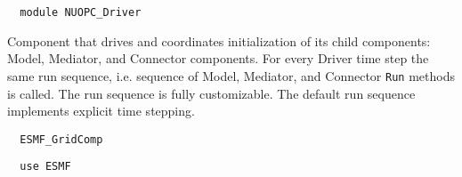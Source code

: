  
\setlength{\parskip}{0pt}
\setlength{\parindent}{0pt}
\setlength{\baselineskip}{11pt}
 
\def\bv{\begin{verbatim}}
\def\ev{\end{verbatim}}
\def\be{\begin{equation}}
\def\ee{\end{equation}}
\def\bea{\begin{eqnarray}}
\def\eea{\end{eqnarray}}
\def\bi{\begin{itemize}}
\def\ei{\end{itemize}}
\def\bn{\begin{enumerate}}
\def\en{\end{enumerate}}
\def\bd{\begin{description}}
\def\ed{\end{description}}
\def\({\left (}
\def\){\right )}
\def\[{\left [}
\def\]{\right ]}
\def\<{\left  \langle}
\def\>{\right \rangle}
\def\cI{{\cal I}}
\def\diag{\mathop{\rm diag}}
\def\tr{\mathop{\rm tr}}


\begin{verbatim}  module NUOPC_Driver
\end{verbatim}

Component that drives and coordinates initialization of its child components: Model, Mediator, and Connector components. For every Driver time step the same run sequence, i.e. sequence of Model, Mediator, and Connector {\tt Run} methods is called. The run sequence is fully customizable. The default run sequence implements explicit time stepping.

\begin{verbatim}  ESMF_GridComp
\end{verbatim}

\begin{verbatim}  use ESMF
\end{verbatim}

